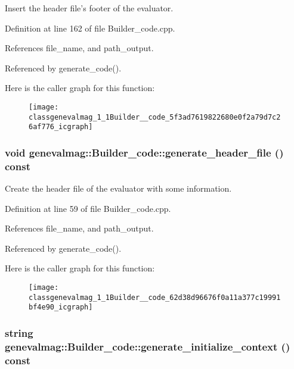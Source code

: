 Insert the header file's footer of the evaluator. 

Definition at line 162 of file Builder\_\-code.cpp.

References file\_\-name, and path\_\-output.

Referenced by generate\_\-code().

Here is the caller graph for this function:\nopagebreak
\begin{figure}[H]
\begin{center}
\leavevmode
\texttt{[image: classgenevalmag\_1\_1Builder\_\_code\_5f3ad7619822680e0f2a79d7c26af776\_icgraph]}
\end{center}
\end{figure}
\hypertarget{classgenevalmag_1_1Builder__code_62d38d96676f0a11a377c19991bf4e90}{
\subsubsection[{generate\_\-header\_\-file}]{\setlength{\rightskip}{0pt plus 5cm}void genevalmag::Builder\_\-code::generate\_\-header\_\-file () const}}
\label{classgenevalmag_1_1Builder__code_62d38d96676f0a11a377c19991bf4e90}


Create the header file of the evaluator with some information. 

Definition at line 59 of file Builder\_\-code.cpp.

References file\_\-name, and path\_\-output.

Referenced by generate\_\-code().

Here is the caller graph for this function:\nopagebreak
\begin{figure}[H]
\begin{center}
\leavevmode
\texttt{[image: classgenevalmag\_1\_1Builder\_\_code\_62d38d96676f0a11a377c19991bf4e90\_icgraph]}
\end{center}
\end{figure}
\hypertarget{classgenevalmag_1_1Builder__code_eb44411cbae61fe53b734486945ab7f4}{
\subsubsection[{generate\_\-initialize\_\-context}]{\setlength{\rightskip}{0pt plus 5cm}string genevalmag::Builder\_\-code::generate\_\-initialize\_\-context () const}}
\label{classgenevalmag_1_1Builder__code_eb44411cbae61fe53b734486945ab7f4}


